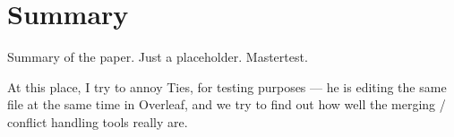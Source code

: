 \chapter{Summary}

Summary of the paper. Just a placeholder. Mastertest. 

At this place, I try to annoy Ties, for testing purposes --- he is editing the same file at the same time in Overleaf, and we try to find out how well the merging / conflict handling tools really are. 
